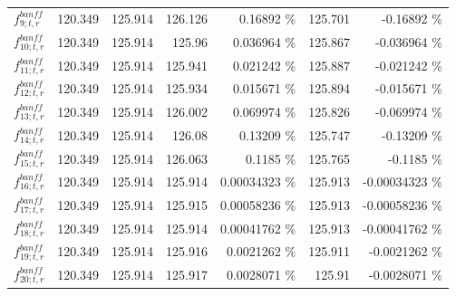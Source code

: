 \begin{table}
\begin{tabular}{| l | r | r | r  r | r  r |}
                                                           $f_{9; t, r}^{banff}$ &         120.349 & 125.914 & 126.126 &         0.16892 \%  &         125.701 &        -0.16892 \%  \\ 
                                                          $f_{10; t, r}^{banff}$ &         120.349 & 125.914 & 125.96 &        0.036964 \%  &         125.867 &       -0.036964 \%  \\ 
                                                          $f_{11; t, r}^{banff}$ &         120.349 & 125.914 & 125.941 &        0.021242 \%  &         125.887 &       -0.021242 \%  \\ 
                                                          $f_{12; t, r}^{banff}$ &         120.349 & 125.914 & 125.934 &        0.015671 \%  &         125.894 &       -0.015671 \%  \\ 
                                                          $f_{13; t, r}^{banff}$ &         120.349 & 125.914 & 126.002 &        0.069974 \%  &         125.826 &       -0.069974 \%  \\ 
                                                          $f_{14; t, r}^{banff}$ &         120.349 & 125.914 & 126.08 &         0.13209 \%  &         125.747 &        -0.13209 \%  \\ 
                                                          $f_{15; t, r}^{banff}$ &         120.349 & 125.914 & 126.063 &          0.1185 \%  &         125.765 &         -0.1185 \%  \\ 
                                                          $f_{16; t, r}^{banff}$ &         120.349 & 125.914 & 125.914 &      0.00034323 \%  &         125.913 &     -0.00034323 \%  \\ 
                                                          $f_{17; t, r}^{banff}$ &         120.349 & 125.914 & 125.915 &      0.00058236 \%  &         125.913 &     -0.00058236 \%  \\ 
                                                          $f_{18; t, r}^{banff}$ &         120.349 & 125.914 & 125.914 &      0.00041762 \%  &         125.913 &     -0.00041762 \%  \\ 
                                                          $f_{19; t, r}^{banff}$ &         120.349 & 125.914 & 125.916 &       0.0021262 \%  &         125.911 &      -0.0021262 \%  \\ 
                                                          $f_{20; t, r}^{banff}$ &         120.349 & 125.914 & 125.917 &       0.0028071 \%  &          125.91 &      -0.0028071 \%  \\ 

\end{tabular}
\end{table}
